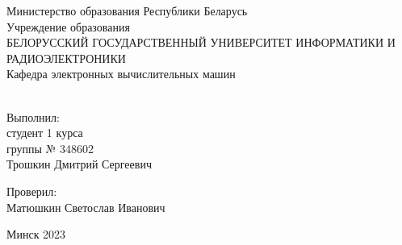 \begin{titlepage}
	\newpage \null
	\begin{center}
		Министерство образования Республики Беларусь \\[0.4cm] 

			Учреждение образования \\

			\MakeUppercase{БЕЛОРУССКИЙ ГОСУДАРСТВЕННЫЙ УНИВЕРСИТЕТ ИНФОРМАТИКИ И РАДИОЭЛЕКТРОНИКИ} \\[0.4cm]

		Кафедра электронных вычислительных машин \\ [4cm]

		 \\ [5cm]
		
		\noindent
		\parbox[t]{0.5\textwidth}{\raggedright
		Выполнил: \\
		студент 1 курса \\
		группы № 348602 \\
		Трошкин Дмитрий Сергеевич}\hfill
		\parbox[t]{0.5\textwidth}{\raggedleft
		Проверил: \\
		Матюшкин Светослав Иванович}%
		\vfill

		{\normalsize Минск 2023}
	\end{center}
\end{titlepage}